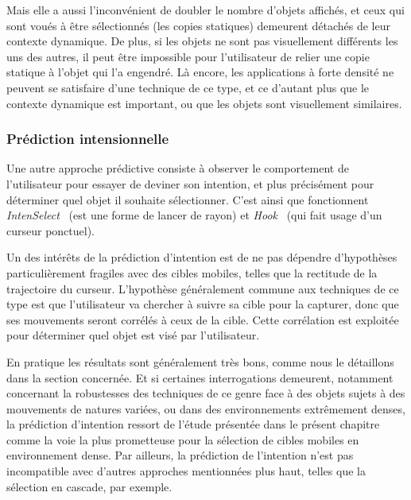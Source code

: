     Mais elle a aussi l'inconvénient de doubler le nombre d'objets affichés, et ceux qui sont voués à être sélectionnés (les copies statiques) demeurent détachés de leur contexte dynamique. De plus, si les objets ne sont pas visuellement différents les uns des autres, il peut être impossible pour l'utilisateur de relier une copie statique à l'objet qui l'a engendré. Là encore, les applications à forte densité ne peuvent se satisfaire d'une technique de ce type, et ce d'autant plus que le contexte dynamique est important, ou que les objets sont visuellement similaires.
    
	\subsubsection{Prédiction intensionnelle}
    Une autre approche prédictive consiste à observer le comportement de l'utilisateur pour essayer de deviner son intention, et plus précisément pour déterminer quel objet il souhaite sélectionner. C'est ainsi que fonctionnent \emph{IntenSelect}~\cite{de2005intenselect} (est une forme de lancer de rayon) et \emph{Hook}~\cite{ortega2013hook} (qui fait usage d'un curseur ponctuel).
    
    Un des intérêts de la prédiction d'intention est de ne pas dépendre d'hypothèses particulièrement \og fragiles \fg{} avec des cibles mobiles, telles que la rectitude de la trajectoire du curseur. L'hypothèse généralement commune aux techniques de ce type est que l'utilisateur va chercher à \og suivre \fg{} sa cible pour la capturer, donc que ses mouvements seront corrélés à ceux de la cible. Cette corrélation est exploitée pour déterminer quel objet est visé par l'utilisateur.
    
    En pratique les résultats sont généralement très bons, comme nous le détaillons dans la section concernée. Et si certaines interrogations demeurent, notamment concernant la robustesses des techniques de ce genre face à des objets sujets à des mouvements de natures variées, ou dans des environnements extrêmement denses, la prédiction d'intention ressort de l'étude présentée dans le présent chapitre comme la voie la plus prometteuse pour la sélection de cibles mobiles en environnement dense. Par ailleurs, la prédiction de l'intention n'est pas incompatible avec d'autres approches mentionnées plus haut, telles que la sélection en cascade, par exemple.
    
